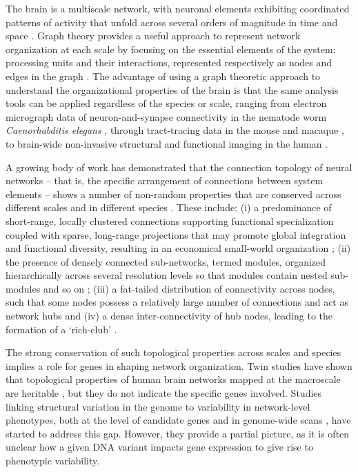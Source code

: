 The brain is a multiscale network, with neuronal elements exhibiting coordinated patterns of activity that unfold across several orders of magnitude in time and space \citep{Buzsaki2004,Lichtman2011,Fornito2016}.
Graph theory provides a useful approach to represent network organization at each scale by focusing on the essential elements of the system: processing units and their interactions, represented respectively as nodes and edges in the graph \citep{Bullmore2009,Fornito2016}.
The advantage of using a graph theoretic approach to understand the organizational properties of the brain is that the same analysis tools can be applied regardless of the species or scale, ranging from electron micrograph data of neuron-and-synapse connectivity in the nematode worm \textit{Caenorhabditis elegans} \citep{White1986,Varshney2011}, through tract-tracing data in the mouse \citep{Oh2014,Gamanut2018} and macaque \citep{Stephan2001,Markov2014}, to brain-wide non-invasive structural and functional imaging in the human \citep{Bassett2009a,Bullmore2009,Fornito2013}.

A growing body of work has demonstrated that the connection topology of neural networks -- that is, the specific arrangement of connections between system elements -- shows a number of non-random properties that are conserved across different scales and in different species \citep{Bullmore2009,Sporns2011,Fornito2016,VandenHeuvel2016,Schroter2017}. These include: (i) a predominance of short-range, locally clustered connections supporting functional specialization coupled with sparse, long-range projections that may promote global integration and functional diversity, resulting in an economical small-world organization \citep{Watts1998,Bassett2017,Betzel2017}; (ii) the presence of densely connected sub-networks, termed modules, organized hierarchically across several resolution levels so that modules contain nested sub-modules and so on \citep{Meunier2009,Bassett2010}; (iii) a fat-tailed distribution of connectivity across nodes, such that some nodes possess a relatively large number of connections and act as network hubs  \citep{VandenHeuvel2011,Towlson2013,VandenHeuvel2016} and (iv) a dense inter-connectivity of hub nodes, leading to the formation of a `rich-club' \citep{Zamora-Lopez2010,VandenHeuvel2011,Harriger2012,Towlson2013}.

The strong conservation of such topological properties across scales and species implies a role for genes in shaping network organization. Twin studies have shown that topological properties of human brain networks mapped at the macroscale are heritable \citep{Smit2008,Fornito2011,VandenHeuvel2013e,Bohlken2014,Sinclair2015,Zhan2015,Colclough2017}, but they do not indicate the specific genes involved. Studies linking structural variation in the genome to variability in network-level phenotypes, both at the level of candidate genes \citep{Liu2010,Brown2011,Dennis2011,Markett2017} and in genome-wide scans \citep{Jahanshad2013}, have started to address this gap. However, they provide a partial picture, as it is often unclear how a given DNA variant impacts gene expression to give rise to phenotypic variability.

